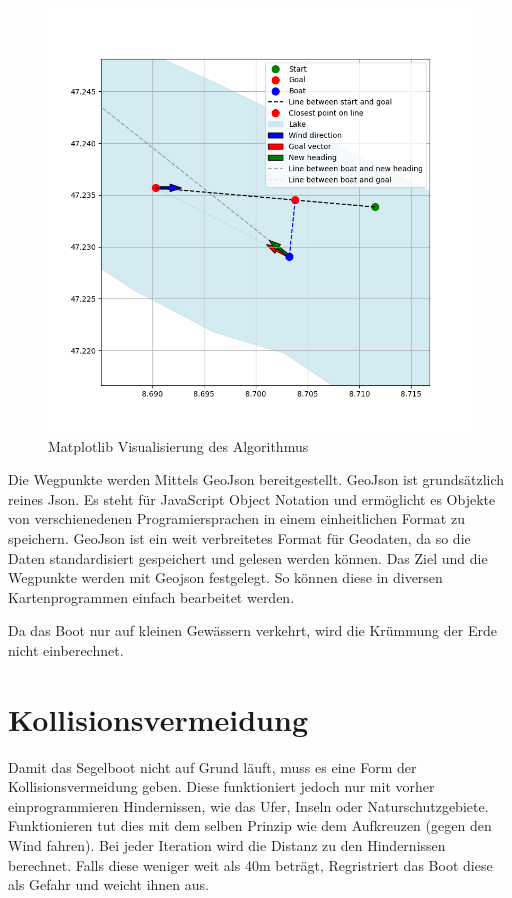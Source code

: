 \begin{figure}[H]
    \centering
    \includegraphics[width=1\linewidth]{assets/3.png}
    \caption{Matplotlib Visualisierung des Algorithmus}
    
\end{figure}

Die Wegpunkte werden Mittels GeoJson bereitgestellt. GeoJson ist grundsätzlich reines Json. Es steht für JavaScript Object Notation und ermöglicht es Objekte von verschienedenen Programiersprachen in einem einheitlichen Format zu speichern. GeoJson ist ein weit verbreitetes Format für Geodaten, da so die Daten standardisiert gespeichert und gelesen werden können.
Das Ziel und die Wegpunkte werden mit Geojson festgelegt. So können diese in diversen Kartenprogrammen einfach bearbeitet werden.

Da das Boot nur auf kleinen Gewässern verkehrt, wird die Krümmung der Erde nicht einberechnet.

\section{Kollisionsvermeidung}
Damit das Segelboot nicht auf Grund läuft, muss es eine Form der Kollisionsvermeidung geben. Diese funktioniert jedoch nur mit vorher einprogrammieren Hindernissen, wie das Ufer, Inseln oder Naturschutzgebiete. 
Funktionieren tut dies mit dem selben Prinzip wie dem Aufkreuzen (gegen den Wind fahren). Bei jeder Iteration wird die Distanz zu den Hindernissen berechnet. Falls diese weniger weit als 40m beträgt, Regristriert das Boot diese als Gefahr und weicht ihnen aus.  

